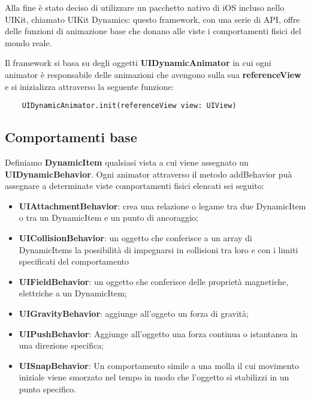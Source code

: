 Alla fine è stato deciso di utilizzare un pacchetto
nativo di iOS incluso nello UIKit\cite{uikit}, chiamato UIKit Dynamics\cite{uidynamics}: questo framework,
con una serie di API, offre delle funzioni di animazione base che 
donano alle viste i comportamenti fisici del mondo reale.

Il framework si basa su degli oggetti \textbf{UIDynamicAnimator} in cui ogni animator è responsabile delle
animazioni che avengono sulla sua \textbf{referenceView} e si inizializza 
attraverso la seguente funzione:

\begin{verbatim}
    UIDynamicAnimator.init(referenceView view: UIView)
\end{verbatim}


\subsection{Comportamenti base}
Definiamo \textbf{DynamicItem} qualsiasi vista a cui viene assegnato un \textbf{UIDynamicBehavior}.
Ogni animator attraverso il metodo addBehavior puà assegnare a determinate
viste comportamenti fisici elencati sei seguito: 

\begin{itemize}
    \item\textbf{UIAttachmentBehavior}: crea una relazione o legame tra due DynamicItem o tra un DynamicItem e un punto di ancoraggio;
    \item\textbf{UICollisionBehavior}: un oggetto che conferisce a un array di DynamicItems la possibilità di impegnarsi in collisioni tra loro e con i limiti specificati del comportamento
    \item\textbf{UIFieldBehavior}: un oggetto che conferisce delle proprietà magnetiche, elettriche a un DynamicItem;
    \item\textbf{UIGravityBehavior}: aggiunge all'oggeto un forza di gravità;
    \item\textbf{UIPushBehavior}: Aggiunge all'oggetto una forza continua o istantanea in una direzione specifica;
    \item\textbf{UISnapBehavior}: Un comportamento simile a una molla il cui movimento iniziale viene smorzato nel tempo in modo che l'oggetto si stabilizzi in un punto specifico.
\end{itemize}


